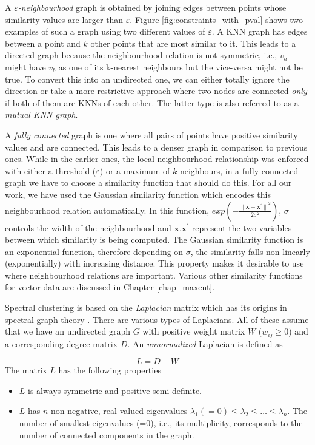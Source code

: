A \textit{$\varepsilon$-neighbourhood} graph is obtained by joining edges between points whose similarity values are larger than  $\varepsilon$. 
Figure-\ref{fig:constraints_with_pval} shows two examples of such a graph using two different values of $\varepsilon$. A \ac{KNN} graph has edges between a 
point and $k$ other points that are most similar to it. This leads to a directed graph because the neighbourhood relation is not 
symmetric, i.e., $v_{a}$ might have $v_{b}$ as one of its k-nearest neighbours but the vice-versa might not be true. To convert this into an 
undirected one, we can either totally ignore the direction or take a more restrictive approach where two nodes are connected \textit{only} if 
both of them are \aclp{KNN} of each other. The latter type is also referred to as a \textit{mutual \acl{KNN} graph}.

A \textit{fully connected} graph is one where all pairs of points have positive similarity values and are connected. This leads to a denser 
graph in comparison to previous ones. While in the earlier ones, the local neighbourhood relationship was enforced with either a 
threshold ($\varepsilon$) or a maximum of $k$-neighbours, in a fully connected graph we have to choose a similarity function that should 
do this. For all our work, we have used the Gaussian similarity function which encodes this neighbourhood relation automatically. 
In this function, $exp \left( -\frac{{\parallel \textbf{x}-\textbf{x}^{'} \parallel}^{2}}{2\sigma^{2}}\right)$, $\sigma$ controls the width of 
the neighbourhood and $\textbf{x}$,$\textbf{x}^{'}$ represent the two variables between which similarity is being computed. The Gaussian similarity 
function is an exponential function, therefore depending on $\sigma$, the similarity falls non-linearly 
(exponentially) with increasing distance. This property makes it desirable to use where neighbourhood relations are important. Various 
other similarity functions for vector data are discussed in Chapter-\ref{chap_maxent}.

Spectral clustering is based on the \textit{Laplacian} matrix which has its origins in spectral graph theory \citep{chung1997spectralgraph}. There are various types of Laplacians. All of these assume that we have an undirected graph $G$ with positive weight matrix $W$ ($w_{ij} \geq 0$) and a corresponding degree matrix $D$. An \textit{unnormalized} Laplacian is defined as 

\[
	L = D-W
\] 
The matrix $L$ has the following properties
\begin{itemize}
    \item $L$ is always symmetric and positive semi-definite.
    \item $L$ has $n$ non-negative, real-valued eigenvalues $\lambda_{1}(=0) \leq \lambda_{2}\leq \dots \leq \lambda_{n}$. The number of smallest eigenvalues (=0), i.e., its multiplicity, corresponds to the number of connected components in the graph. 
\end{itemize}

